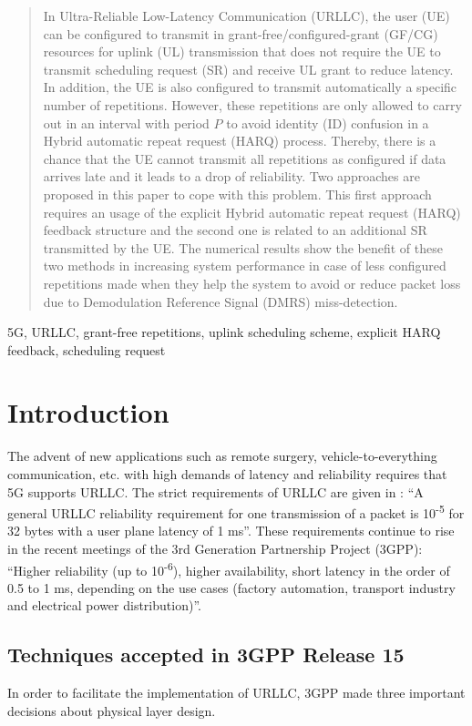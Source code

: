 \documentclass[conference]{IEEEtran}
\begin{document}
\begin{abstract}
In Ultra-Reliable Low-Latency Communication (URLLC), the user (UE) can be configured to transmit in grant-free/configured-grant (GF/CG) resources for  uplink (UL) transmission that does not require the UE to transmit scheduling request (SR) and receive UL grant to reduce latency. In addition, the UE is also configured to transmit automatically a specific number of repetitions. However, these repetitions are only allowed to carry out in an interval with period $P$ to avoid identity (ID) confusion in a Hybrid automatic repeat request (HARQ) process. Thereby, there is a chance that the UE cannot transmit all repetitions as configured if data arrives late and it leads to a drop of reliability. Two approaches are proposed in this paper to cope with this problem. This first approach requires an usage of the explicit Hybrid automatic repeat request (HARQ) feedback structure and the second one is related to an additional SR transmitted by the UE. The numerical results show the benefit of these two methods in increasing system performance in case of less configured repetitions made when they help the system to avoid or reduce packet loss due to Demodulation Reference Signal (DMRS) miss-detection.
\end{abstract}

\begin{IEEEkeywords}
5G, URLLC, grant-free repetitions, uplink scheduling scheme, explicit HARQ feedback, scheduling request
\end{IEEEkeywords}

\section{Introduction} \label{I}
The advent of new applications such as remote surgery, vehicle-to-everything communication, etc. with high demands of latency and reliability requires that 5G supports URLLC. The strict requirements of URLLC are given in \cite{b6}: ``A general URLLC reliability requirement for one transmission of a packet is 10\textsuperscript{-5} for 32 bytes with a user plane latency of 1 ms''. These requirements continue to rise in the recent meetings of the 3rd Generation Partnership  Project  (3GPP): ``Higher reliability (up to 10\textsuperscript{-6}), higher availability, short latency in the order of 0.5 to 1 ms, depending on the use cases (factory automation, transport industry and electrical power distribution)''\cite{b8}.

\subsection{Techniques accepted in 3GPP Release 15}\label{IAA}
In order to facilitate the implementation of URLLC, 3GPP made three important decisions about physical layer design.
\end{document}
